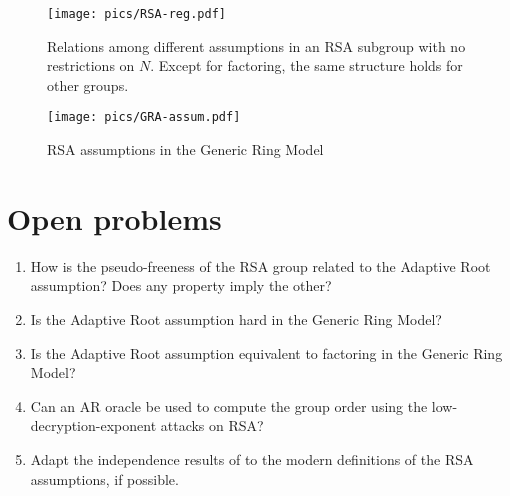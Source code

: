 \documentclass[a4paper]{article}
\begin{document}
\begin{figure}
    \centering
    \texttt{[image: pics/RSA-reg.pdf]}
    \caption{Relations among different assumptions in an RSA subgroup with no restrictions on $N$. Except for factoring, the same structure holds for other groups.}
    \label{fig:rsa}
\end{figure}

\begin{figure}
    \centering
    \texttt{[image: pics/GRA-assum.pdf]}
    \caption{RSA assumptions in the Generic Ring Model}
    \label{fig:gra}
\end{figure}
\section{Open problems}

\begin{enumerate}
    \item How is the pseudo-freeness of the RSA group related to the Adaptive Root assumption? Does any property imply the other?
    \item Is the Adaptive Root assumption hard in the Generic Ring Model?
    \item Is the Adaptive Root assumption equivalent to factoring in the Generic Ring Model? 
    \item Can an AR oracle be used to compute the group order using the low-decryption-exponent attacks on RSA?
    \item Adapt the independence results of \cite{LM71} to the modern definitions of the RSA assumptions, if possible.
\end{enumerate}



\end{document}
